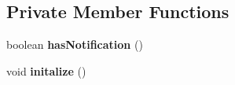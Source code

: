 \subsection*{Private Member Functions}
\begin{DoxyCompactItemize}
\item 
boolean {\bfseries has\+Notification} ()\hypertarget{classcom_1_1example_1_1sebastian_1_1tindertp_1_1MatchingActivity_a9178516390921dbc93d07617f719e6dc}{}\label{classcom_1_1example_1_1sebastian_1_1tindertp_1_1MatchingActivity_a9178516390921dbc93d07617f719e6dc}

\item 
void {\bfseries initalize} ()\hypertarget{classcom_1_1example_1_1sebastian_1_1tindertp_1_1MatchingActivity_ac03020d0d0f199d8cec821fa16955e2c}{}\label{classcom_1_1example_1_1sebastian_1_1tindertp_1_1MatchingActivity_ac03020d0d0f199d8cec821fa16955e2c}

\end{DoxyCompactItemize}
